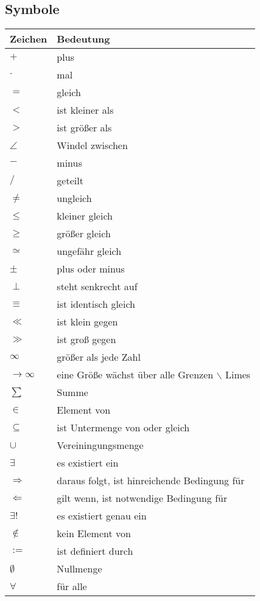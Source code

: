 \documentclass[a4paper]{scrartcl}
\DeclareMathOperator{\Forall}{\forall}
\begin{document}
\subsection{Symbole}
\label{sec-2-1}
\begin{center}
\begin{tabular}{ll}
Zeichen & Bedeutung\\
\hline
$+$ & plus\\
$\cdot$ & mal\\
$=$ & gleich\\
$<$ & ist kleiner als\\
$>$ & ist größer als\\
$\angle$ & Windel zwischen\\
$-$ & minus\\
$/$ & geteilt\\
$\neq$ & ungleich\\
$\leq$ & kleiner gleich\\
$\geq$ & größer gleich\\
$\simeq$ & ungefähr gleich\\
$\pm$ & plus oder minus\\
$\perp$ & steht senkrecht auf\\
$\equiv$ & ist identisch gleich\\
$\ll$ & ist klein gegen\\
$\gg$ & ist groß gegen\\
$\infty$ & größer als jede Zahl\\
$\to \infty$ & eine Größe wächst über alle Grenzen $\backslash$ Limes\\
$\sum$ & Summe\\
$\in$ & Element von\\
$\subseteq$ & ist Untermenge von oder gleich\\
$\cup$ & Vereiningungsmenge\\
$\exists$ & es existiert ein\\
$\Rightarrow$ & daraus folgt, ist hinreichende Bedingung für\\
$\Leftarrow$ & gilt wenn, ist notwendige Bedingung für\\
$\exists!$ & es existiert genau ein\\
$\notin$ & kein Element von\\
$:=$ & ist definiert durch\\
$\emptyset$ & Nullmenge\\
$\Forall$ & für alle\\
\end{tabular}
\end{center}
\end{document}
